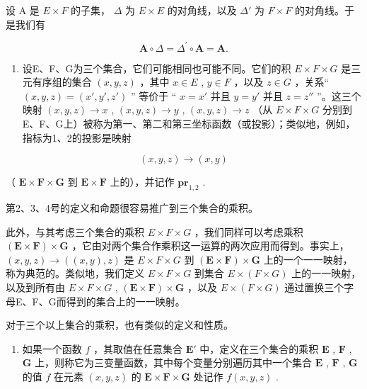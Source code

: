 设 A 是 \(E \times F\) 的子集， \(\Delta\) 为 \(E \times E\) 的对角线，以及 \(\Delta'\) 为 \(F \times F\) 的对角线。于是我们有

\[
\mathbf {A} \circ \Delta = \Delta^ {\prime} \circ \mathbf {A} = \mathbf {A}.\tag{32}
\]

\begin{enumerate}
\def\labelenumi{\arabic{enumi}.}
\setcounter{enumi}{11}
\tightlist
\item
  设E、F、G为三个集合，它们可能相同也可能不同。它们的积 \(E \times F \times G\) 是三元有序组的集合 \((x, y, z)\) ，其中 \(x \in E\) , \(y \in F\) ，以及 \(z \in G\) ，关系“ \((x, y, z) = (x', y', z')\) '' 等价于 `` \(x = x'\) 并且 \(y = y'\) 并且 \(z = z''\) ''。这三个映射 \((x, y, z) \to x\) , \((x, y, z) \to y\) , \((x, y, z) \to z\) （从 \(E \times F \times G\) 分别到E、F、G上）被称为第一、第二和第三坐标函数（或投影）；类似地，例如，指标为1、2的投影是映射
\end{enumerate}

\[
(x, y, z) \rightarrow (x, y)
\]

（ \(\mathbf{E} \times \mathbf{F} \times \mathbf{G}\) 到 \(\mathbf{E} \times \mathbf{F}\) 上的），并记作 \(\mathbf{pr}_{1,2}\) .

第2、3、4号的定义和命题很容易推广到三个集合的乘积。

此外，与其考虑三个集合的乘积 \(E \times F \times G\) ，我们同样可以考虑乘积 \((\mathbf{E} \times \mathbf{F}) \times \mathbf{G}\) ，它由对两个集合作乘积这一运算的两次应用而得到。事实上， \((x, y, z) \to ((x, y), z)\) 是 \(E \times F \times G\) 到 \((\mathbf{E} \times \mathbf{F}) \times \mathbf{G}\) 上的一个一一映射，称为典范的。类似地，我们定义 \(E \times F \times G\) 到集合 \(E \times (F \times G)\) 上的一一映射，以及到所有由 \(E \times F \times G\) , \((\mathbf{E} \times \mathbf{F}) \times \mathbf{G}\) ，以及 \(E \times (F \times G)\) 通过置换三个字母E、F、G而得到的集合上的一一映射。

对于三个以上集合的乘积，也有类似的定义和性质。

\begin{enumerate}
\def\labelenumi{\arabic{enumi}.}
\setcounter{enumi}{12}
\tightlist
\item
  如果一个函数 \(f\) ，其取值在任意集合 \(\mathbf{E}'\) 中，定义在三个集合的乘积 \(\mathbf{E}\) , \(\mathbf{F}\) , \(\mathbf{G}\) 上，则称它为三变量函数，其中每个变量分别遍历其中一个集合 \(\mathbf{E}\) , \(\mathbf{F}\) , \(\mathbf{G}\) 的值 \(f\) 在元素 \((x, y, z)\) 的 \(\mathbf{E} \times \mathbf{F} \times \mathbf{G}\) 处记作 \(f(x, y, z)\) .
\end{enumerate}

